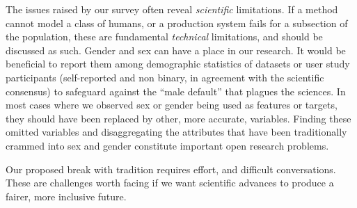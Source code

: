\documentclass[sigconf,balance=false]{acmart}
\begin{document}
The issues raised by our survey often reveal \emph{scientific} limitations. If a method cannot model a class of humans, or a production system fails for a subsection of the population, these are fundamental \emph{technical} limitations, and should be discussed as such. Gender and sex can have a place in our research. It would be beneficial to report them among demographic statistics of datasets or user study participants (self-reported and non binary, in agreement with the scientific consensus) to
safeguard against the “male default” that plagues the sciences. In most cases where we observed sex or gender being used as features or targets, they should have been replaced by other, more accurate, variables. Finding these omitted variables and disaggregating the attributes that have been traditionally crammed into sex and gender constitute important open research problems.

Our proposed break with tradition requires effort, and difficult conversations. These are challenges worth facing if we want scientific advances to produce a fairer, more inclusive future.
\end{document}

